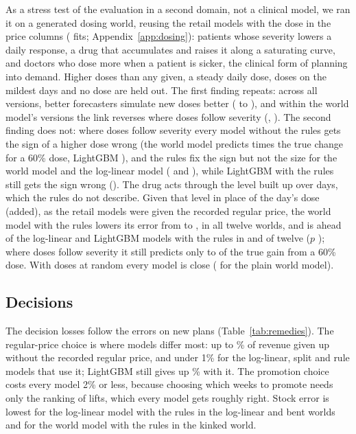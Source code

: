 As a stress test of the evaluation in a second domain, not a clinical model, we ran it on a generated dosing world,
reusing the retail models with the dose in the price columns (\dsFits{} fits; Appendix~\ref{app:dosing}): patients whose severity lowers a daily response, a drug that accumulates and
raises it along a saturating curve, and doctors who dose more when a patient is sicker, the clinical form of
planning into demand. Higher doses than any given, a steady daily dose, doses on the mildest days and no dose are
held out. The first finding repeats: across all versions, better forecasters simulate new doses better
(\dsLinkLo{} to \dsLinkHi{}), and within the world model's versions the link reverses where doses follow severity
(\dsWmLinkHigh{}, \dsWmLinkHighCi{}). The second finding does not: where doses follow severity every model without
the rules gets the sign of a higher dose wrong (the world model predicts \dsWmRatio{} times the true change for a
60\% dose, LightGBM \dsLgbRatio{}), and the rules fix the sign but not the size for the world model and the log-linear model (\dsShapeRatio{} and
\dsLlShapeRatio{}), while LightGBM with the rules still gets the sign wrong (\dsLgbShapeRatio{}). The drug acts through the level built up over days, which the rules do not
describe. Given that level in place of the day's dose (added), as the retail models were given the recorded regular
price, the world model with the rules lowers its error from \dsShapeErr{} to \dsExpShapeErr{}, in all twelve worlds,
and is ahead of the log-linear and LightGBM models with the rules in \dsExpVsLlWon{} and \dsExpVsLgbWon{} of twelve
($p$ \dsExpVsLlP{}); where doses follow severity it still predicts only \dsExpRatioLo{} to \dsExpRatioHi{} of the
true gain from a 60\% dose. With doses at random every model is close (\dsWmZero{} for the plain world model).

\subsection{Decisions}

The decision losses follow the errors on new plans (Table~\ref{tab:remedies}). The regular-price choice is where
models differ most: up to \priceBWm\% of revenue given up without the recorded regular price, and under 1\% for the
log-linear, split and rule models that use it; LightGBM still gives up \priceLLgbRr\% with it. The
promotion choice costs every model 2\% or less, because choosing which weeks to promote needs only the ranking of
lifts, which every model gets roughly right. Stock error is lowest for the log-linear model with the rules in the log-linear and bent worlds and for the world
model with the rules in the kinked world.


